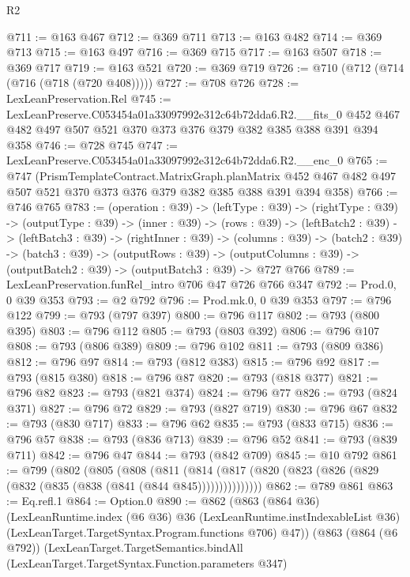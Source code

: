 \begin{lexlean}{R2}
\begin{coremodule}
@711 := @163 @467
@712 := @369 @711
@713 := @163 @482
@714 := @369 @713
@715 := @163 @497
@716 := @369 @715
@717 := @163 @507
@718 := @369 @717
@719 := @163 @521
@720 := @369 @719
@726 := @710 (@712 (@714 (@716 (@718 (@720 @408)))))
@727 := @708 @726
@728 := LexLeanPreservation.Rel
@745 := LexLeanPreserve.C053454a01a33097992e312c64b72dda6.R2.__fits_0
    @452
    @467
    @482
    @497
    @507
    @521
    @370
    @373
    @376
    @379
    @382
    @385
    @388
    @391
    @394
    @358
@746 := @728 @745
@747 := LexLeanPreserve.C053454a01a33097992e312c64b72dda6.R2.__enc_0
@765 := @747
    (PrismTemplateContract.MatrixGraph.planMatrix
      @452
      @467
      @482
      @497
      @507
      @521
      @370
      @373
      @376
      @379
      @382
      @385
      @388
      @391
      @394
      @358)
@766 := @746 @765
@783 := (operation : @39) ->
  (leftType : @39) ->
  (rightType : @39) ->
  (outputType : @39) ->
  (inner : @39) ->
  (rows : @39) ->
  (leftBatch2 : @39) ->
  (leftBatch3 : @39) ->
  (rightInner : @39) ->
  (columns : @39) ->
  (batch2 : @39) ->
  (batch3 : @39) ->
  (outputRows : @39) ->
  (outputColumns : @39) -> (outputBatch2 : @39) -> (outputBatch3 : @39) -> @727 @766
@789 := LexLeanPreservation.funRel_intro @706 @47 @726 @766 @347
@792 := Prod.{0, 0} @39 @353
@793 := @2 @792
@796 := Prod.mk.{0, 0} @39 @353
@797 := @796 @122
@799 := @793 (@797 @397)
@800 := @796 @117
@802 := @793 (@800 @395)
@803 := @796 @112
@805 := @793 (@803 @392)
@806 := @796 @107
@808 := @793 (@806 @389)
@809 := @796 @102
@811 := @793 (@809 @386)
@812 := @796 @97
@814 := @793 (@812 @383)
@815 := @796 @92
@817 := @793 (@815 @380)
@818 := @796 @87
@820 := @793 (@818 @377)
@821 := @796 @82
@823 := @793 (@821 @374)
@824 := @796 @77
@826 := @793 (@824 @371)
@827 := @796 @72
@829 := @793 (@827 @719)
@830 := @796 @67
@832 := @793 (@830 @717)
@833 := @796 @62
@835 := @793 (@833 @715)
@836 := @796 @57
@838 := @793 (@836 @713)
@839 := @796 @52
@841 := @793 (@839 @711)
@842 := @796 @47
@844 := @793 (@842 @709)
@845 := @10 @792
@861 := @799
    (@802
      (@805
        (@808
          (@811
            (@814 (@817 (@820 (@823 (@826 (@829 (@832 (@835 (@838 (@841 (@844 @845)))))))))))))))
@862 := @789 @861
@863 := Eq.refl.{1}
@864 := Option.{0}
@890 := @862
    (@863
      (@864 @36)
      (LexLeanRuntime.index
        (@6 @36)
        @36
        (LexLeanRuntime.instIndexableList @36)
        (LexLeanTarget.TargetSyntax.Program.functions @706)
        @47))
    (@863
      (@864 (@6 @792))
      (LexLeanTarget.TargetSemantics.bindAll
        (LexLeanTarget.TargetSyntax.Function.parameters @347)

\end{coremodule}
\end{lexlean}
